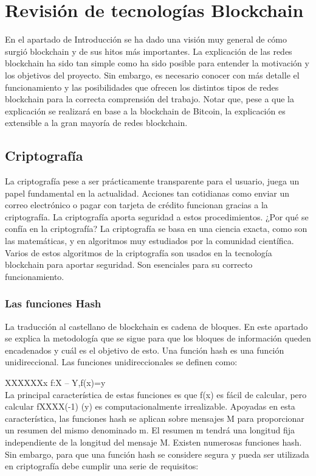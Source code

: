 \section{Revisión de tecnologías Blockchain}

En el apartado de Introducción se ha dado una visión muy general de cómo surgió blockchain y de sus hitos más importantes. La explicación de las redes blockchain ha sido tan simple como ha sido posible para entender la motivación y los objetivos del proyecto. Sin embargo, es necesario conocer con más detalle el funcionamiento y las posibilidades que ofrecen los distintos tipos de redes blockchain para la correcta comprensión del trabajo. Notar que, pese a que la explicación se realizará en base a la blockchain de Bitcoin, la explicación es extensible a la gran mayoría de redes blockchain.\newline

\subsection{Criptografía}

La criptografía pese a ser prácticamente transparente para el usuario, juega un papel fundamental en la actualidad. Acciones tan cotidianas como enviar un correo electrónico o pagar con tarjeta de crédito funcionan gracias a la criptografía. La criptografía aporta seguridad a estos procedimientos. ¿Por qué se confía en la criptografía? La criptografía se basa en una ciencia exacta, como son las matemáticas, y en algoritmos muy estudiados por la comunidad científica. Varios de estos algoritmos de la criptografía son usados en la tecnología blockchain para aportar seguridad. Son esenciales para su correcto funcionamiento.\newline

\subsubsection{Las funciones Hash}
La traducción al castellano de blockchain es cadena de bloques. En este apartado se explica la metodología que se sigue para que los bloques de información queden encadenados y cuál es el objetivo de esto.
Una función hash es una función unidireccional. Las funciones unidireccionales se definen como:\newline


XXXXXXx f:X -- Y,f(x)=y \\
La principal característica de estas funciones es que f(x) es fácil de calcular, pero calcular fXXXX(-1) (y) es computacionalmente irrealizable. Apoyadas en esta característica, las funciones hash se aplican sobre mensajes M para proporcionar un resumen del mismo denominado m. El resumen m tendrá una longitud fija independiente de la longitud del mensaje M.
Existen numerosas funciones hash. Sin embargo, para que una función hash se considere segura y pueda ser utilizada en criptografía debe cumplir una serie de requisitos:

